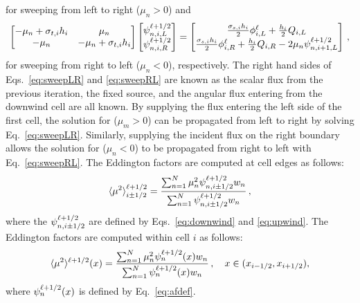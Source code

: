 for sweeping from left to right ($\mu_n > 0$) and 
	\begin{equation} \label{eq:sweepRL}
		\left[\begin{matrix} 
			-\mu_n + \sigma_{t,i}h_i & \mu_n \\ 
			-\mu_n & -\mu_n + \sigma_{t,i}h_i \\ 
		\end{matrix} \right]
		\left[\begin{matrix}
			\psi_{n,i,L}^{\ell+1/2} \\ \psi_{n,i,R}^{\ell+1/2}
		\end{matrix} \right]
		= \left[\begin{matrix}
			\frac{\sigma_{s,i}h_i}{2} \phi_{i,L}^\ell + \frac{h_i}{2} Q_{i,L} \\ 
			\frac{\sigma_{s,i}h_i}{2} \phi_{i,R}^\ell + \frac{h_i}{2} Q_{i,R} - 2\mu_n \psi_{n,i+1,L}^{\ell+1/2}
		\end{matrix} \right]
		\,, 
	\end{equation}
for sweeping from right to left ($\mu_n < 0$), respectively. The right hand sides of Eqs.~\ref{eq:sweepLR} and \ref{eq:sweepRL} are known 
as the scalar flux from the previous iteration, the fixed source, and the angular flux entering from the downwind cell are all known. By supplying the flux entering the left side of the first cell, the solution for ($\mu_m > 0$) can be propagated from left to right by solving Eq.~\ref{eq:sweepLR}. Similarly, supplying the incident flux on the right boundary allows the solution for ($\mu_n < 0$) to be propagated from right to left with Eq.~\ref{eq:sweepRL}. The Eddington factors are computed at cell edges as follows: 
	\begin{equation} \label{lldg:edde}
		\langle \mu^2 \rangle^{\ell+1/2}_{i\pm 1/2} = \frac{
			\sum_{n=1}^N \mu_n^2 \psi_{n,i\pm 1/2}^{\ell+1/2} w_n
		}{
			\sum_{n=1}^N \psi_{n,i\pm 1/2}^{\ell+1/2} w_n 
		} \,,
	\end{equation}
where the $\psi_{n,i\pm1/2}^{\ell+1/2}$ are defined by Eqs.~\ref{eq:downwind} and \ref{eq:upwind}. The Eddington factors are 
computed within cell $i$ as follows:
\begin{equation} \label{lldg:eddi}
		\langle \mu^2 \rangle^{\ell+1/2}(x) = \frac{
			\sum_{n=1}^N \mu_n^2 \psi_{n}^{\ell+1/2}(x) w_n
		}{
			\sum_{n=1}^N \psi_{n}^{\ell+1/2}(x) w_n 
		} \,, \quad x\in(x_{i-1/2},x_{i+1/2}),
	\end{equation}
where $\psi_{n}^{\ell+1/2}(x)$ is defined by Eq.~\ref{eq:afdef}.
